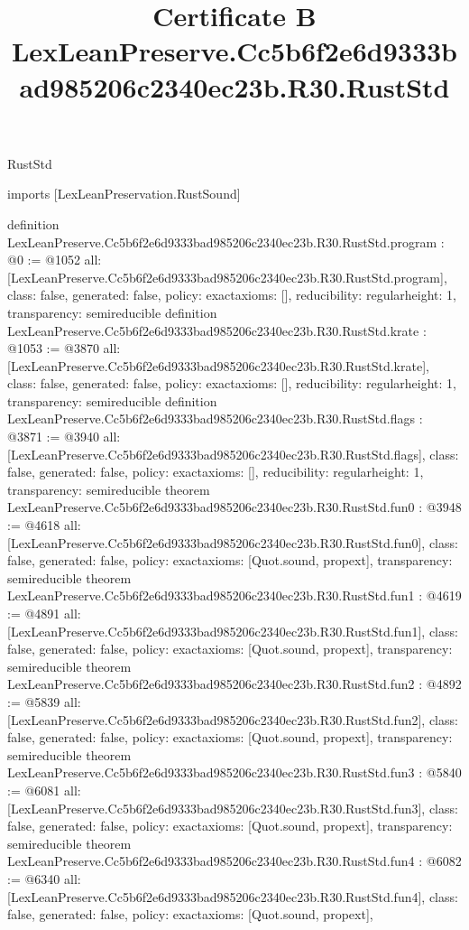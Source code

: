 \begin{lexlean}{RustStd}
\title{Certificate B LexLeanPreserve.Cc5b6f2e6d9333bad985206c2340ec23b.R30.RustStd}
\begin{coremodule}
imports [LexLeanPreservation.RustSound]

definition LexLeanPreserve.Cc5b6f2e6d9333bad985206c2340ec23b.R30.RustStd.program : @0 := @1052 {
  all: [LexLeanPreserve.Cc5b6f2e6d9333bad985206c2340ec23b.R30.RustStd.program],
  class: false,
  generated: false,
  policy: exact{axioms: []},
  reducibility: regular{height: 1},
  transparency: semireducible
}
definition LexLeanPreserve.Cc5b6f2e6d9333bad985206c2340ec23b.R30.RustStd.krate : @1053 := @3870 {
  all: [LexLeanPreserve.Cc5b6f2e6d9333bad985206c2340ec23b.R30.RustStd.krate],
  class: false,
  generated: false,
  policy: exact{axioms: []},
  reducibility: regular{height: 1},
  transparency: semireducible
}
definition LexLeanPreserve.Cc5b6f2e6d9333bad985206c2340ec23b.R30.RustStd.flags : @3871 := @3940 {
  all: [LexLeanPreserve.Cc5b6f2e6d9333bad985206c2340ec23b.R30.RustStd.flags],
  class: false,
  generated: false,
  policy: exact{axioms: []},
  reducibility: regular{height: 1},
  transparency: semireducible
}
theorem LexLeanPreserve.Cc5b6f2e6d9333bad985206c2340ec23b.R30.RustStd.fun0 : @3948 := @4618 {
  all: [LexLeanPreserve.Cc5b6f2e6d9333bad985206c2340ec23b.R30.RustStd.fun0],
  class: false,
  generated: false,
  policy: exact{axioms: [Quot.sound, propext]},
  transparency: semireducible
}
theorem LexLeanPreserve.Cc5b6f2e6d9333bad985206c2340ec23b.R30.RustStd.fun1 : @4619 := @4891 {
  all: [LexLeanPreserve.Cc5b6f2e6d9333bad985206c2340ec23b.R30.RustStd.fun1],
  class: false,
  generated: false,
  policy: exact{axioms: [Quot.sound, propext]},
  transparency: semireducible
}
theorem LexLeanPreserve.Cc5b6f2e6d9333bad985206c2340ec23b.R30.RustStd.fun2 : @4892 := @5839 {
  all: [LexLeanPreserve.Cc5b6f2e6d9333bad985206c2340ec23b.R30.RustStd.fun2],
  class: false,
  generated: false,
  policy: exact{axioms: [Quot.sound, propext]},
  transparency: semireducible
}
theorem LexLeanPreserve.Cc5b6f2e6d9333bad985206c2340ec23b.R30.RustStd.fun3 : @5840 := @6081 {
  all: [LexLeanPreserve.Cc5b6f2e6d9333bad985206c2340ec23b.R30.RustStd.fun3],
  class: false,
  generated: false,
  policy: exact{axioms: [Quot.sound, propext]},
  transparency: semireducible
}
theorem LexLeanPreserve.Cc5b6f2e6d9333bad985206c2340ec23b.R30.RustStd.fun4 : @6082 := @6340 {
  all: [LexLeanPreserve.Cc5b6f2e6d9333bad985206c2340ec23b.R30.RustStd.fun4],
  class: false,
  generated: false,
  policy: exact{axioms: [Quot.sound, propext]},
}
\end{coremodule}
\end{lexlean}
